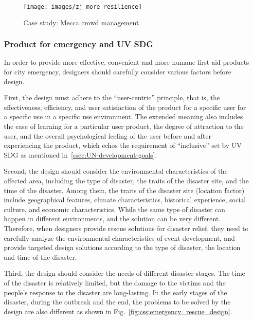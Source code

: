 \documentclass[letterpaper, twocolumn, 10pt, conference]{IEEEtran}
\begin{document}
\begin{figure}[h!]
        \centering
        \texttt{[image: images/zj\_more\_resilience]}
        \caption{Case study: Mecca crowd management}
        \label{fig:zj:more_resilience}
\end{figure}

\subsubsection{Product for emergency and UV SDG}

In order to provide more effective, convenient and more humane first-aid products for city emergency, designers should carefully consider various factors before design. 

First, the design must adhere to the \enquote{user-centric} principle, that is, the effectiveness, efficiency, and user satisfaction of the product for a specific user for a specific use in a specific use environment. The extended meaning also includes the ease of learning for a particular user product, the degree of attraction to the user, and the overall psychological feeling of the user before and after experiencing the product, which echos the requirement of  \enquote{inclusive} set by UV SDG as mentioned in~\ref{ssec:UN-development-goals}.

Second, the design should consider the environmental characteristics of the affected area, including the type of disaster, the traits of the disaster site, and the time of the disaster. Among them, the traits of the disaster site (location factor) include geographical features, climate characteristics, historical experience, social culture, and economic characteristics. While the same type of disaster can happen in different environments, and the solution can be very different. Therefore, when designers provide rescue solutions for disaster relief, they need to carefully analyze the environmental characteristics of event development, and provide targeted design solutions according to the type of disaster, the location and time of the disaster. 

Third, the design should consider the needs of different disaster stages. The time of the disaster is relatively limited, but the damage to the victims and the people's response to the disaster are long-lasting. In the early stages of the disaster, during the outbreak and the end, the problems to be solved by the design are also different as shown in Fig.~\ref{fig:css:emergency_rescue_design}.
\end{document}
